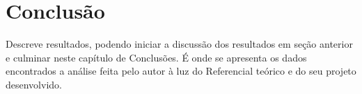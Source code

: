 \chapter[Conclusão]{Conclusão}

Descreve resultados, podendo iniciar a discussão dos resultados em seção anterior e culminar neste capítulo de Conclusões. É onde se apresenta os dados encontrados a análise feita pelo autor à luz do Referencial teórico e do seu projeto desenvolvido.